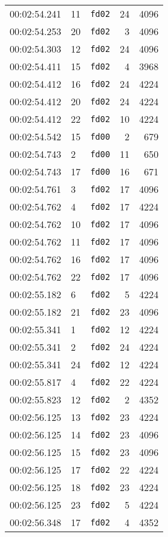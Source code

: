 \documentclass{article}
\begin{document}
\begin{longtable}{lllrr}
00:02:54.241 & 11 & \texttt{fd02} & 24 & 4096 \\
00:02:54.253 & 20 & \texttt{fd02} & 3 & 4096 \\
00:02:54.303 & 12 & \texttt{fd02} & 24 & 4096 \\
00:02:54.411 & 15 & \texttt{fd02} & 4 & 3968 \\
00:02:54.412 & 16 & \texttt{fd02} & 24 & 4224 \\
00:02:54.412 & 20 & \texttt{fd02} & 24 & 4224 \\
00:02:54.412 & 22 & \texttt{fd02} & 10 & 4224 \\
00:02:54.542 & 15 & \texttt{fd00} & 2 & 679 \\
00:02:54.743 & 2 & \texttt{fd00} & 11 & 650 \\
00:02:54.743 & 17 & \texttt{fd00} & 16 & 671 \\
00:02:54.761 & 3 & \texttt{fd02} & 17 & 4096 \\
00:02:54.762 & 4 & \texttt{fd02} & 17 & 4224 \\
00:02:54.762 & 10 & \texttt{fd02} & 17 & 4096 \\
00:02:54.762 & 11 & \texttt{fd02} & 17 & 4096 \\
00:02:54.762 & 16 & \texttt{fd02} & 17 & 4096 \\
00:02:54.762 & 22 & \texttt{fd02} & 17 & 4096 \\
00:02:55.182 & 6 & \texttt{fd02} & 5 & 4224 \\
00:02:55.182 & 21 & \texttt{fd02} & 23 & 4096 \\
00:02:55.341 & 1 & \texttt{fd02} & 12 & 4224 \\
00:02:55.341 & 2 & \texttt{fd02} & 24 & 4224 \\
00:02:55.341 & 24 & \texttt{fd02} & 12 & 4224 \\
00:02:55.817 & 4 & \texttt{fd02} & 22 & 4224 \\
00:02:55.823 & 12 & \texttt{fd02} & 2 & 4352 \\
00:02:56.125 & 13 & \texttt{fd02} & 23 & 4224 \\
00:02:56.125 & 14 & \texttt{fd02} & 23 & 4096 \\
00:02:56.125 & 15 & \texttt{fd02} & 23 & 4096 \\
00:02:56.125 & 17 & \texttt{fd02} & 22 & 4224 \\
00:02:56.125 & 18 & \texttt{fd02} & 23 & 4224 \\
00:02:56.125 & 23 & \texttt{fd02} & 5 & 4224 \\
00:02:56.348 & 17 & \texttt{fd02} & 4 & 4352 \\

\end{longtable}
\end{document}

